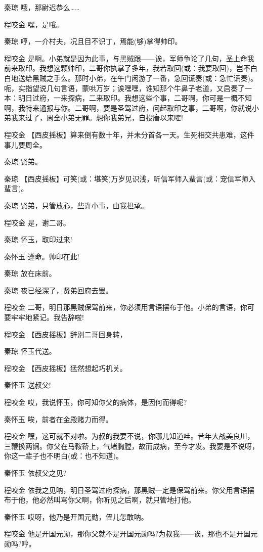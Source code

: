秦琼 哦，那尉迟恭么\ldots{}\ldots{}

程咬金 嘿，是哦。

秦琼 哼，一介村夫，况且目不识丁，焉能(够)掌得帅印。

程咬金
是啊。小弟就是因为此事，与黑贼跟------诶，军师争论了几句，圣上命我前来取印。我想这颗帅印，二哥你执掌了多年，我若取回(或：我要取回)，岂不白白地送给黑贼之手么。那时小弟，在午门闲游了一番，急回谎奏(或：急忙谎奏)。呃，实指望说几句言语，蒙哄万岁；诶嘿嘿，谁知那个牛鼻子老道，又启奏了一本：明日过府，一来探病，二来取印。我想这些个事，二哥啊，你可是一概不知啊，我特来通报与你。二哥啊，要是圣驾过府，问起取印之事，二哥啊，你就说小弟我来过了，周全小弟无罪。想你我弟兄，自投唐以来嚯!

程咬金
【西皮摇板】算来倒有数十年，并未分首各一天。生死相交共患难，这件事儿要周全。

秦琼 贤弟。

秦琼
【西皮摇板】可笑(或：堪笑)万岁见识浅，听信军师入蜚言(或：宠信军师入蜚言)。

秦琼 贤弟，只管放心，些许小事，由我担承。

程咬金 是，谢二哥。

秦琼 怀玉，取印过来!

秦怀玉 遵命。帅印在此!

秦琼 放在床前。

秦琼 夜已经深了，贤弟回府去罢。

程咬金
二哥，明日那黑贼保驾前来，你必须用言语摆布于他。小弟的言语，你可要牢牢地紧记。我告辞啦!

程咬金 【西皮摇板】辞别二哥回身转，

秦琼 怀玉代送。

程咬金 【西皮摇板】猛然想起巧机关。

秦怀玉 送叔父!

程咬金 哎，我说怀玉，你可知你父的病体，是因何而得呢?

秦怀玉 唉，前者在金殿赌力而得。

程咬金
嘿，这可就不对啦。为叔的我要不说，你哪儿知道哇。昔年大战美良川，三鞭换两锏。你父在马鞍鞒上，气堵胸膛，故而成病，至今才发。我要是不说呀，你这一辈子也不明白(或：也不知道)。

秦怀玉 依叔父之见?

程咬金
依我之见呐，明日圣驾过府探病，那黑贼一定是保驾前来。你父用言语摆布于他，他必然叫骂你父啊，你听见之后啊，就只管地打他。

秦怀玉 哎呀，他乃是开国元勋，侄儿怎敢呐。

程咬金
他是开国元勋，那你父就不是开国元勋吗?为叔我------诶，那也不是开国元勋吗?哼。

